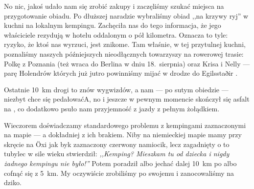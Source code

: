 

No nic, jakoś udało nam się zrobić zakupy i zaczęliśmy szukać miejsca na przygotowanie obiadu. Po dłuższej naradzie wybraliśmy obiad ,,na krzywy ryj'' w kuchni na lokalnym kempingu. Zachęciła nas do tego informacja, że jego właściciele rezydują w hotelu oddalonym o pół kilometra. Oznacza to tyle: ryzyko, że ktoś nas wyrzuci, jest znikome. Tam właśnie, w tej przytulnej kuchni, poznaliśmy naszych późniejszych nieodłącznych towarzyszy na rowerowej trasie: Polkę z Poznania (też wraca do Berlina w dniu \mbox{18. sierpnia}) oraz Krisa i Nelly --- parę Holendrów których już jutro powinniśmy mijać w drodze do Egilsstaðir .

Ostatnie 10~km drogi to znów wygwizdów, a nam --- po sutym obiedzie --- niezbyt chce się pedałować\textellipsis A, no i jeszcze w pewnym momencie skończył się asfalt na , co dodatkowo psuło nam przyjemność z jazdy z pełnym żołądkiem.


Wieczorem doświadczamy standardowego problemu z kempingami zaznaczonymi na mapie --- a dokładniej z ich brakiem. Niby na niemieckiej mapie mamy przy skręcie na Öxi jak byk zaznaczony czerwony namiocik, lecz zagadnięty o to tubylec w sile wieku stwierdził: \emph{,,Kemping? Mieszkam tu od dziecka i nigdy żadnego kempingu nie było!''} Potem poradził albo jechać dalej 10~km po  albo cofnąć się z 5~km. My oczywiście zrobiliśmy po swojemu i zanocowaliśmy na dziko.

